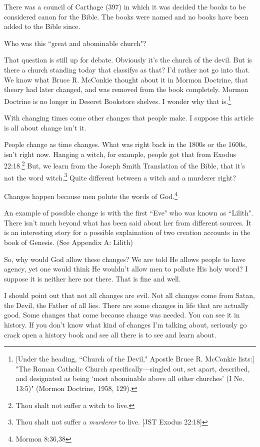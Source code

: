 \documentclass{article}
\begin{document}
There was a council of Carthage (397) in which it was decided the books to
be considered canon for the Bible. The books were named and no books have
been added to the Bible since.

Who was this ``great and abominable church"?

That question is still up for debate. Obviously it's the church of the devil. 
But is there a church standing today that classifys as that? I'd rather not 
go into that. We know what Bruce R. McConkie thought about it in Mormon 
Doctrine, that theory had later changed, and was removed from the book 
completely. Mormon Doctrine is no longer in Deseret Bookstore shelves. I wonder 
why that is.\footnote{[Under the heading, ``Church of the Devil," Apostle Bruce 
R. McConkie lists:] "The Roman Catholic Church specifically—singled out, set 
apart, described, and designated as being ‘most abominable above all other 
churches’ (I Ne. 13:5)" (Mormon Doctrine, 1958, 129).}

With changing times come other changes that people make. I suppose this article 
is all about change isn't it.

People change as time changes. What was right back in the 1800s or the 1600s, 
isn't right now. Hanging a witch, for example, people got that from Exodus 
22:18.\footnote{Thou shalt not suffer a witch to live.} But, we learn from the 
Joseph Smith Translation of the Bible, that it's not the word 
witch.\footnote{Thou shalt not suffer a \textit{murderer} to live. 
[JST Exodus 22:18]} Quite different between a witch and a murderer right?

Changes happen because men polute the words of God.\footnote{Mormon 8:36,38}

An example of possible change is with the first ``Eve" who was known as
``Lilith". There isn't much beyond what has been said about her from different
sources. It is an interesting story for a possible explaination of two
creation accounts in the book of Genesis. (See Appendix A: Lilith)

So, why would God allow these changes? We are told He allows people to have
agency, yet one would think He wouldn't allow men to pollute His holy word?
I suppose it is neither here nor there. That is fine and well.

I should point out that not all changes are evil. Not all changes come from 
Satan, the Devil, the Father of all lies. There are some changes in life that 
are actually good. Some changes that come because change was needed. You can see 
it in history. If you don't know what kind of changes I'm talking about, 
seriously go crack open a history book and see all there is to see and learn 
about.
\end{document}
